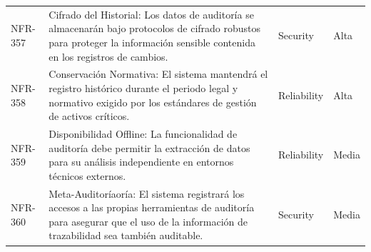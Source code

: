 \begin{longtable}{>{\raggedright\arraybackslash}p{} >{\raggedright\arraybackslash}p{} >{\raggedright\arraybackslash}p{} >{\raggedright\arraybackslash}p{}}
NFR-357 & Cifrado del Historial: Los datos de auditoría se almacenarán bajo protocolos de cifrado robustos para proteger la información sensible contenida en los registros de cambios. & Security & Alta \\
NFR-358 & Conservación Normativa: El sistema mantendrá el registro histórico durante el periodo legal y normativo exigido por los estándares de gestión de activos críticos. & Reliability & Alta \\
NFR-359 & Disponibilidad Offline: La funcionalidad de auditoría debe permitir la extracción de datos para su análisis independiente en entornos técnicos externos. & Reliability & Media \\
NFR-360 & Meta-Auditoríaoría: El sistema registrará los accesos a las propias herramientas de auditoría para asegurar que el uso de la información de trazabilidad sea también auditable. & Security & Media \\
\bottomrule
\end{longtable}
\normalsize